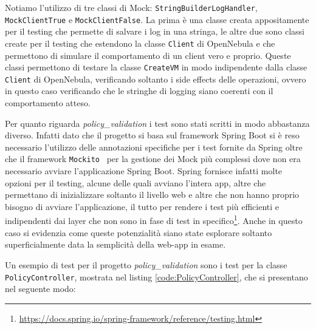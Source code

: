 Notiamo l'utilizzo di tre classi di Mock: \texttt{StringBuilderLogHandler}, \texttt{MockClientTrue} e \texttt{MockClientFalse}. La prima è una classe creata appositamente per il testing che permette di salvare i log in una stringa, le altre due sono classi create per il testing che estendono la classe \texttt{Client} di OpenNebula e che permettono di simulare il comportamento di un client vero e proprio. Queste classi permettono di testare la classe \texttt{CreateVM} in modo indipendente dalla classe \texttt{Client} di OpenNebula, verificando soltanto i side effects delle operazioni, ovvero in questo caso verificando che le stringhe di logging siano coerenti con il comportamento atteso.\par
Per quanto riguarda \emph{policy\_validation} i test sono stati scritti in modo abbastanza diverso. Infatti dato che il progetto si basa sul framework Spring Boot si è reso necessario l'utilizzo delle annotazioni specifiche per i test fornite da Spring oltre che il framework \texttt{Mockito}~\cite{mockito} per la gestione dei Mock più complessi dove non era necessario avviare l'applicazione Spring Boot. Spring fornisce infatti molte opzioni per il testing, alcune delle quali avviano l'intera app, altre che permettano di inizializzare soltanto il livello web e altre che non hanno proprio bisogno di avviare l'applicazione, il tutto per rendere i test più efficienti e indipendenti dai layer che non sono in fase di test in specifico\footnote{\url{https://docs.spring.io/spring-framework/reference/testing.html}}. Anche in questo caso si evidenzia come queste potenzialità siano state esplorare soltanto superficialmente data la semplicità della web-app in esame.\par
Un esempio di test per il progetto \emph{policy\_validation} sono i test per la classe \texttt{PolicyController}, mostrata nel listing \ref{code:PolicyController}, che si presentano nel seguente modo:
